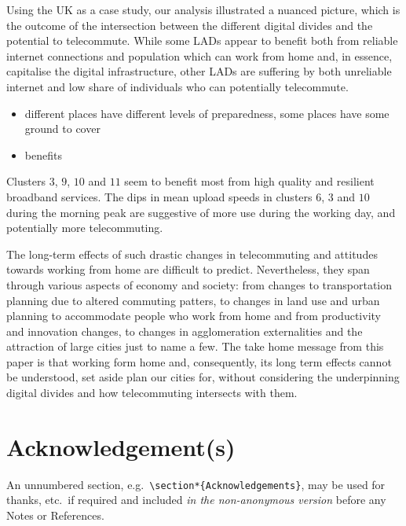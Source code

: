 \documentclass[Royal,times,sageh]{sagej}
\begin{document}
Using the UK as a case study, our analysis illustrated a nuanced
picture, which is the outcome of the intersection between the different
digital divides and the potential to telecommute. While some LADs appear
to benefit both from reliable internet connections and population which
can work from home and, in essence, capitalise the digital
infrastructure, other LADs are suffering by both unreliable internet and
low share of individuals who can potentially telecommute.

\begin{itemize}
\item
  different places have different levels of preparedness, some places
  have some ground to cover
\item
  benefits
\end{itemize}

Clusters \(3\), \(9\), \(10\) and \(11\) seem to benefit most from high
quality and resilient broadband services. The dips in mean upload speeds
in clusters \(6\), \(3\) and \(10\) during the morning peak are
suggestive of more use during the working day, and potentially more
telecommuting.

The long-term effects of such drastic changes in telecommuting and
attitudes towards working from home are difficult to predict.
Nevertheless, they span through various aspects of economy and society:
from changes to transportation planning due to altered commuting
patters, to changes in land use and urban planning to accommodate people
who work from home \citep{BUDNITZ2020102713, ELLDER2020102777} and from
productivity and innovation changes, to changes in agglomeration
externalities and the attraction of large cities \citep{econobs} just to
name a few. The take home message from this paper is that working form
home and, consequently, its long term effects cannot be understood, set
aside plan our cities for, without considering the underpinning digital
divides and how telecommuting intersects with them.

\hypertarget{acknowledgements}{%
\section*{Acknowledgement(s)}\label{acknowledgements}}

An unnumbered section,
e.g.~\texttt{\textbackslash{}section*\{Acknowledgements\}}, may be used
for thanks, etc.~if required and included \emph{in the non-anonymous
version} before any Notes or References.
\end{document}
